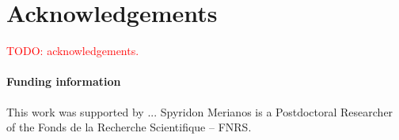 \section*{Acknowledgements}
\textcolor{red}{TODO: acknowledgements.}

\paragraph{Funding information}
This work was supported by ...
Spyridon Merianos is a Postdoctoral Researcher of the Fonds de la Recherche Scientifique -- FNRS.
